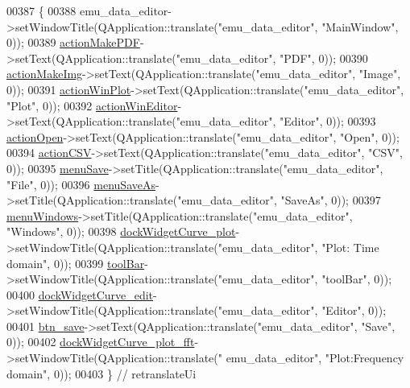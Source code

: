 \begin{DoxyCode}
00387     \{
00388         emu\_data\_editor->setWindowTitle(QApplication::translate(\textcolor{stringliteral}{"emu\_data\_editor"}, \textcolor{stringliteral}{"MainWindow"}, 0));
00389         \hyperlink{a00079_af013c084ff0ed9ae39a60aa7a39bdd91}{actionMakePDF}->setText(QApplication::translate(\textcolor{stringliteral}{"emu\_data\_editor"}, \textcolor{stringliteral}{"PDF"}, 0));
00390         \hyperlink{a00079_a345313e538e5ef49cd27c1fc0bdd4173}{actionMakeImg}->setText(QApplication::translate(\textcolor{stringliteral}{"emu\_data\_editor"}, \textcolor{stringliteral}{"Image"}, 0));
00391         \hyperlink{a00079_a0aeb289d8df9db6f4329e9000e44d511}{actionWinPlot}->setText(QApplication::translate(\textcolor{stringliteral}{"emu\_data\_editor"}, \textcolor{stringliteral}{"Plot"}, 0));
00392         \hyperlink{a00079_aa5d56420958ab4fd1239e29714d75e18}{actionWinEditor}->setText(QApplication::translate(\textcolor{stringliteral}{"emu\_data\_editor"}, \textcolor{stringliteral}{"Editor"}, 0));
00393         \hyperlink{a00079_a3ceb57268680eb23f6a3d522b303bb43}{actionOpen}->setText(QApplication::translate(\textcolor{stringliteral}{"emu\_data\_editor"}, \textcolor{stringliteral}{"Open"}, 0));
00394         \hyperlink{a00079_afae3d61aac77b6c20a7953b3adba9672}{actionCSV}->setText(QApplication::translate(\textcolor{stringliteral}{"emu\_data\_editor"}, \textcolor{stringliteral}{"CSV"}, 0));
00395         \hyperlink{a00079_a36a184d4c55f5de1b542257cbe23adaf}{menuSave}->setTitle(QApplication::translate(\textcolor{stringliteral}{"emu\_data\_editor"}, \textcolor{stringliteral}{"File"}, 0));
00396         \hyperlink{a00079_a2568794cbc6cc9907104efbfd79eba7d}{menuSaveAs}->setTitle(QApplication::translate(\textcolor{stringliteral}{"emu\_data\_editor"}, \textcolor{stringliteral}{"SaveAs"}, 0));
00397         \hyperlink{a00079_a0c7cba2d30d21689f48f1981e976c0b6}{menuWindows}->setTitle(QApplication::translate(\textcolor{stringliteral}{"emu\_data\_editor"}, \textcolor{stringliteral}{"Windows"}, 0));
00398         \hyperlink{a00079_a0edc87fb115fede171c0da1f99000874}{dockWidgetCurve\_plot}->setWindowTitle(QApplication::translate(\textcolor{stringliteral}{"emu\_data\_editor"},
       \textcolor{stringliteral}{"Plot: Time domain"}, 0));
00399         \hyperlink{a00079_a884ecf47fc47f20bd60e9406b1ef88f1}{toolBar}->setWindowTitle(QApplication::translate(\textcolor{stringliteral}{"emu\_data\_editor"}, \textcolor{stringliteral}{"toolBar"}, 0));
00400         \hyperlink{a00079_a83360bdd61e994537715aa7c38e4e5b6}{dockWidgetCurve\_edit}->setWindowTitle(QApplication::translate(\textcolor{stringliteral}{"emu\_data\_editor"},
       \textcolor{stringliteral}{"Editor"}, 0));
00401         \hyperlink{a00079_a3b0808ff0825375685673655eb4785fc}{btn\_save}->setText(QApplication::translate(\textcolor{stringliteral}{"emu\_data\_editor"}, \textcolor{stringliteral}{"Save"}, 0));
00402         \hyperlink{a00079_a7474d72172d9e269e8f3cb22bbe2fc86}{dockWidgetCurve\_plot\_fft}->setWindowTitle(QApplication::translate(\textcolor{stringliteral}{"
      emu\_data\_editor"}, \textcolor{stringliteral}{"Plot:Frequency domain"}, 0));
00403     \} \textcolor{comment}{// retranslateUi}
\end{DoxyCode}


